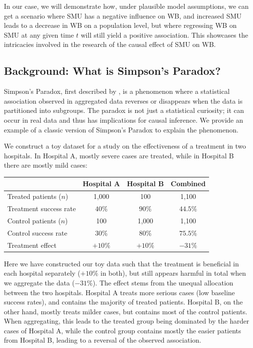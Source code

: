 In our case, we will demonstrate how, under plausible model assumptions, we can get a scenario where SMU has a negative influence on WB, and increased SMU leads to a decrease in WB on a population level, but where regressing WB on SMU at any given time $t$ will still yield a positive association. This showcases the intricacies involved in the research of the causal effect of SMU on WB\@.

\subsection{Background: What is Simpson's Paradox?}
\label{sec:abm:simpsons:bg}
Simpson's Paradox, first described by \textcite{Simpson1951}, is a phenomenon where a statistical association observed in aggregated data reverses or disappears when the data is partitioned into subgroups. The paradox is not just a statistical curiosity; it can occur in real data and thus has implications for causal inference. We provide an example of a classic version of Simpson's Paradox to explain the phenomenon.

\begin{example}
\label{ex:simpsons}
We construct a toy dataset for a study on the effectiveness of a treatment in two hospitals. In Hospital A, mostly severe cases are treated, while in Hospital B there are mostly mild cases:

\begin{center}
\begin{tabular}{lccc}
\toprule
 & Hospital A & Hospital B & Combined \\
\midrule
Treated patients ($n$) & 1{,}000 & 100 & 1{,}100 \\
Treatment success rate & $40\%$ & $90\%$ & $44.5\%$ \\[4pt]
Control patients ($n$) & 100 & 1{,}000 & 1{,}100 \\
Control success rate & $30\%$ & $80\%$ & $75.5\%$ \\
\midrule
Treatment effect & $+10\%$ & $+10\%$ & $-31\%$ \\
\bottomrule
\end{tabular}
\end{center}

Here we have constructed our toy data such that the treatment is beneficial in each hospital separately ($+10\%$ in both), but still appears harmful in total when we aggregate the data ($-31\%$). The effect stems from the unequal allocation between the two hospitals. Hospital A treats more serious cases (low baseline success rates), and contains the majority of treated patients. Hospital B, on the other hand, mostly treats milder cases, but contains most of the control patients. When aggregating, this leads to the treated group being dominated by the harder cases of Hospital A, while the control group contains mostly the easier patients from Hospital B, leading to a reversal of the observed association.
\end{example}

